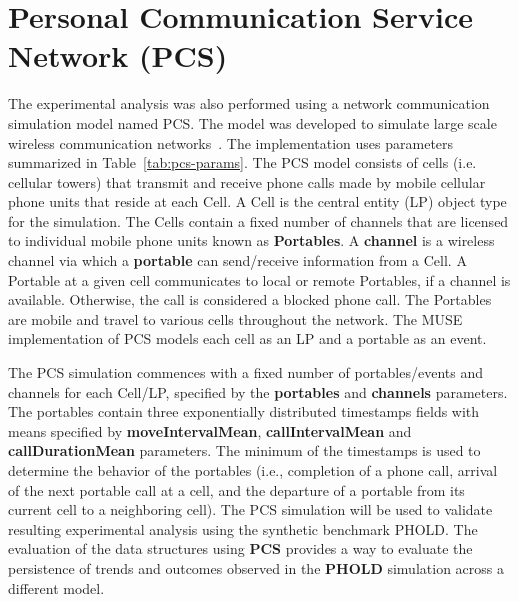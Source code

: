 \section{Personal Communication Service Network (PCS)}\label{sec:pcs}

The experimental analysis was also performed using a network communication simulation model named PCS. The model was developed to simulate large scale wireless communication networks~\cite{carothers-94}. The implementation uses parameters summarized in Table~\ref{tab:pcs-params}. The PCS model consists of cells (i.e. cellular towers) that transmit and receive phone calls made by mobile cellular phone units that reside at each Cell. A Cell is the central entity (LP) object type for the simulation. The Cells contain a fixed number of channels that are licensed to individual mobile phone units known as \textbf{Portables}. A \textbf{channel} is a wireless channel via which a \textbf{portable} can send/receive information from a Cell. A Portable at a given cell communicates to local or remote Portables, if a channel is available. Otherwise, the call is considered a blocked phone call. The Portables are mobile and travel to various cells throughout the network. The MUSE implementation of PCS models each cell as an LP and a portable as an event.

The PCS simulation commences with a fixed number of portables/events and channels for each Cell/LP, specified by the \textbf{portables} and \textbf{channels} parameters. The portables contain three exponentially distributed timestamps fields with means specified by \textbf{moveIntervalMean}, \textbf{callIntervalMean} and \textbf{callDurationMean} parameters. The minimum of the timestamps is used to determine the behavior of the portables (i.e., completion of a phone call, arrival of the next portable call at a cell, and the departure of a portable from its current cell to a neighboring cell). The PCS simulation will be used to validate resulting experimental analysis using the synthetic benchmark PHOLD.  The evaluation of the data structures using \textbf{PCS} provides a way to evaluate the persistence of trends and outcomes observed in the \textbf{PHOLD} simulation across a different model.   
